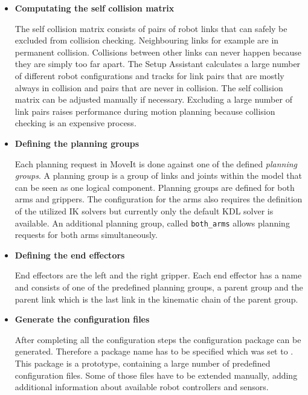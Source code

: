 \begin{itemize}

\item \textbf{Computating the self collision matrix}

The self collision matrix consists of pairs of robot links that can safely be excluded from collision checking. Neighbouring links for example are in permanent collision. Collisions between other links can never happen because they are simply too far apart. The Setup Assistant calculates a large number of different robot configurations and tracks for link pairs that are mostly always in collision and pairs that are never in collision. The self collision matrix can be adjusted manually if necessary. Excluding a large number of link pairs raises performance during motion planning because collision checking is an expensive process.

\item \textbf{Defining the planning groups}

Each planning request in MoveIt is done against one of the defined \emph{planning groups}. A planning group is a group of links and joints within the model that can be seen as one logical component. Planning groups are defined for both arms and grippers. The configuration for the arms also requires the definition of the utilized IK solvers but currently only the default KDL solver is available. An additional planning group, called \texttt{both\_arms} allows planning requests for both arms simultaneously.

\item \textbf{Defining the end effectors}

End effectors are the left and the right gripper. Each end effector has a name and consists of one of the predefined planning groups, a parent group and the parent link which is the last link in the kinematic chain of the parent group.

\item \textbf{Generate the configuration files}

After completing all the configuration steps the configuration package can be generated. Therefore a package name has to be specified which was set to . This package is a prototype, containing a large number of predefined configuration files. Some of those files have to be extended manually, adding additional information about available robot controllers and sensors. 

\end{itemize}

